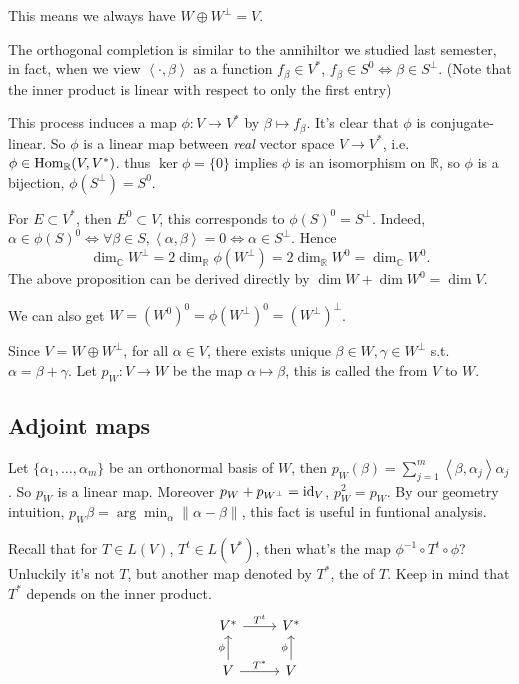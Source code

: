 This means we always have $W\oplus W^\perp = V$.

The orthogonal completion is similar to the annihiltor we studied
last semester, in fact, when we view $\left<\cdot,\beta \right>$ as
a function $f_\beta\in V^*$, $f_\beta \in S^0 \iff \beta\in S^\perp$.
(Note that the inner product is linear with respect to only the first entry)

This process induces a map $\phi: V\to V^*$ by $\beta \mapsto f_\beta$.
It's clear that $\phi$ is conjugate-linear.
So $\phi$ is a linear map between \textit{real} vector space $V\to V^*$,
i.e. $\phi \in \operatorname{Hom}_{\mathbb{R}}(V, V^*)$.
thus $\ker \phi = \{0\}$ implies $\phi$ is an isomorphism on $\mathbb{R}$,
so $\phi$ is a bijection, $\phi(S^\perp) = S^0$.

For $E \subset V^*$, then $E^0 \subset V$, this corresponds
to $\phi(S)^0 = S^\perp$. Indeed, $\alpha\in \phi(S)^0
\iff \forall \beta\in S, \left<\alpha, \beta \right> = 0
\iff \alpha\in S^\perp$.
Hence
\[
	\dim_{\mathbb{C}}W^\perp = 2\dim_{\mathbb{R}}\phi(W^\perp)
	= 2\dim_{\mathbb{R}}W^0 = \dim_{\mathbb{C}} W^0.
\]
The above proposition can be derived directly by $\dim W + \dim W^0 = \dim V$.

We can also get $W=(W^0)^0 = \phi(W^\perp)^0 = (W^\perp)^\perp$.

\begin{definition}
	Since $V = W \oplus W^\perp$, for all  $\alpha\in V$,
	there exists unique $\beta\in W, \gamma\in W^\perp$ s.t. $\alpha = \beta+\gamma$.
	Let $p_W : V\to W$ be the map $\alpha\mapsto \beta$, this
	is called the  from $V$ to $W$.
\end{definition}

\subsection{Adjoint maps}
\label{sub:Adjoint maps}


Let $\{\alpha_1,\dots,\alpha_m\}$ be an orthonormal basis of $W$,
then $p_W(\beta) = \sum_{j=1}^{m} \left<\beta, \alpha_j \right>\alpha_j$.
So $p_W$ is a linear map. Moreover $p_W + p_{W^\perp} = \operatorname{id}_V$,
$p_W^2 = p_W$. By our geometry intuition,
$p_W\beta = \arg\min_{\alpha} \lVert \alpha - \beta \rVert$,
this fact is useful in funtional analysis.

Recall that for $T\in L(V)$, $T^t \in L(V^*)$, then what's
the map $\phi^{-1}\circ T^t\circ \phi$?
Unluckily it's not $T$, but another map denoted by $T^*$, the 
of $T$. Keep in mind that $T^*$ depends on the inner product.
\begin{equation*}
\begin{tikzcd}
	V^*\rar["T^t"] &V^*\\
	V\uar["\phi"]\rar["T^*"] &V\uar["\phi"]
\end{tikzcd}
\end{equation*}

